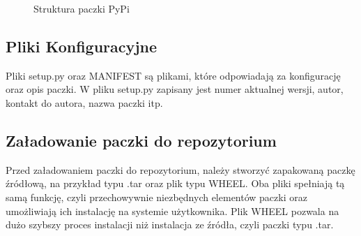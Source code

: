     \begin{figure}
    \centering
        \begin{minipage}{7cm}
        \end{minipage}
        \caption{Struktura paczki PyPi}
    \end{figure}
    
    \subsection{Pliki Konfiguracyjne}
    \quad Pliki setup.py oraz MANIFEST są plikami, które odpowiadają za konfigurację oraz opis paczki. W pliku setup.py zapisany jest numer aktualnej wersji, autor, kontakt do autora, nazwa paczki itp. 
    
    \quad 
    
    
    \subsection{Załadowanie paczki do repozytorium}
    
    \quad Przed załadowaniem paczki do repozytorium, należy stworzyć zapakowaną paczkę źródłową, na przykład typu .tar oraz plik typu WHEEL. Oba pliki spełniają tą samą funkcję, czyli przechowywnie niezbędnych elementów paczki oraz umożliwiają ich instalację na systemie użytkownika. Plik WHEEL pozwala na dużo szybszy proces instalacji niż instalacja ze źródła, czyli paczki typu .tar. 
